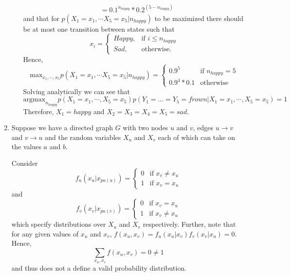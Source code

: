 \begin{enumerate}
\begin{enumerate}
\begin{equation}
\begin{split}
        & = 0.1 ^ {n_{happy}} * 0.2 ^ {(5 - n_{happy})}
        \end{split}
    \end{equation}
    and that for $p(X_1=x_1,\cdots X_5=x_5|n_{happy})$ to be maximized there should be at most one transition between states such that  
        \begin{equation}
            x_i = 
                \begin{cases}
                    Happy, & \text{if } i \leq n_{happy} \\
                    Sad, & \text{otherwise.}
                \end{cases}
        \end{equation}
    Hence, 
        \begin{equation}
            \mbox{max}_{x_1,\cdots,x_5} p(X_1=x_1,\cdots X_5=x_5|n_{happy}) = 
                \begin{cases}
                    0.9^5 & \mbox{if } n_{happy} = 5 \\
                    0.9^4 * 0.1 & \mbox{otherwise}
                \end{cases}
        \end{equation}
    Solving analytically we can see that
    \begin{equation}
    	\mbox{argmax}_{n_{happy}} p(X_1=x_1,\cdots,X_5=x_5)p(Y_1=...=Y_5=frown|X_1=x_1,\cdots,X_5=x_5) = 1
    \end{equation}
    Therefore, $X_1 = happy$ and $X_2 = X_3 = X_4 = X_5 = sad$.
  \end{enumerate}
  \item Suppose we have a directed graph $G$ with two nodes $u$ and $v$, edges $u\to v$ and $v\to u$ and the random variables $X_u$ and $X_v$ each of which can take on the values $a$ and $b$. 

  Consider
    \begin{equation}
        f_u(x_u | x_{pa(u)}) = 
            \begin{cases}
                0 & \mbox{if } x_v \not= x_u \\
                1 & \mbox{if } x_v = x_u
            \end{cases}
    \end{equation}
  and 
    \begin{equation}
        f_v(x_v | x_{pa(v)}) = 
            \begin{cases}
                0 & \mbox{if } x_v = x_u \\
                1 & \mbox{if } x_v \not= x_u
            \end{cases}
    \end{equation}
  which specify distributions over $X_u$ and $X_v$ respectively. Further, note that for any given values of $x_u$ and $x_v$, $f(x_u, x_v) = f_u(x_u | x_v)f_v(x_v | x_u) = 0$. Hence, 
    \begin{equation}
        \sum_{x_u,x_v} f(x_u,x_v) = 0 \not = 1
    \end{equation}
  and thus does not a define a valid probability distribution.


\end{enumerate}
